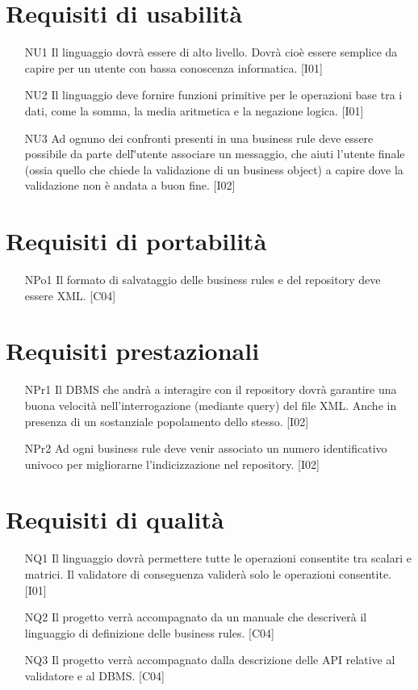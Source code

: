 \documentclass[11pt,titlepage,a4paper]{report}
\begin{document}
\section{Requisiti di usabilit\`a}
\begin{itemize}
\item[NU1]{Il linguaggio dovr\`a essere di alto livello. Dovr\`a cio\`e essere semplice da capire per un utente con bassa conoscenza informatica. [I01]}
\item[NU2]{Il linguaggio deve fornire funzioni primitive per le operazioni base tra i dati, come la somma, la media aritmetica e la negazione logica. [I01]}
\item[NU3]{Ad ognuno dei confronti presenti in una business rule deve essere possibile da parte dell\`'utente associare un messaggio, che aiuti l'utente finale (ossia quello che chiede la validazione di un business object) a capire dove la validazione non \`e andata a buon fine. [I02]}
\end{itemize}

\section{Requisiti di portabilit\`a}
\begin{itemize}
\item[NPo1]{Il formato di salvataggio delle business rules e del repository deve essere XML. [C04]}
\end{itemize}

\section{Requisiti prestazionali}
\begin{itemize}
 \item[NPr1]{Il DBMS che andr\`a a interagire con il repository dovr\`a garantire una buona velocit\`a nell'interrogazione (mediante query) del file XML.
 Anche in presenza di un sostanziale popolamento dello stesso. [I02]}
\item[NPr2]{Ad ogni business rule deve venir associato un numero identificativo univoco per migliorarne l'indicizzazione nel repository. [I02]}
\end{itemize}

\section{Requisiti di qualit\`a}
\begin{itemize}
\item[NQ1]{Il linguaggio dovr\`a permettere tutte le operazioni consentite tra scalari e matrici. Il validatore di conseguenza valider\`a solo le operazioni consentite. [I01]}
\item[NQ2]{Il progetto verr\`a accompagnato da un manuale che descriver\`a il linguaggio di definizione delle business rules. [C04]}
\item[NQ3]{Il progetto verr\`a accompagnato dalla descrizione delle API relative al validatore e al DBMS. [C04]}
\end{itemize}
\newpage

\tableofcontents
\end{document}
